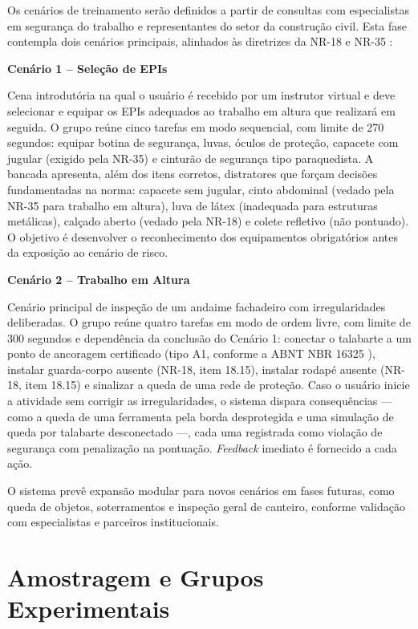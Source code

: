 Os cenários de treinamento serão definidos a partir de consultas com especialistas em segurança do trabalho e representantes do setor da construção civil. Esta fase contempla dois cenários principais, alinhados às diretrizes da NR-18 \cite{brasil2025nr18} e NR-35 \cite{brasil2023nr35}:

\textbf{Cenário 1 -- Seleção de EPIs}

Cena introdutória na qual o usuário é recebido por um instrutor virtual e deve selecionar e equipar os EPIs adequados ao trabalho em altura que realizará em seguida. O grupo reúne cinco tarefas em modo sequencial, com limite de 270 segundos: equipar botina de segurança, luvas, óculos de proteção, capacete com jugular (exigido pela NR-35) e cinturão de segurança tipo paraquedista. A bancada apresenta, além dos itens corretos, distratores que forçam decisões fundamentadas na norma: capacete sem jugular, cinto abdominal (vedado pela NR-35 para trabalho em altura), luva de látex (inadequada para estruturas metálicas), calçado aberto (vedado pela NR-18) e colete refletivo (não pontuado). O objetivo é desenvolver o reconhecimento dos equipamentos obrigatórios antes da exposição ao cenário de risco.

\textbf{Cenário 2 -- Trabalho em Altura}

Cenário principal de inspeção de um andaime fachadeiro com irregularidades deliberadas. O grupo reúne quatro tarefas em modo de ordem livre, com limite de 300 segundos e dependência da conclusão do Cenário 1: conectar o talabarte a um ponto de ancoragem certificado (tipo A1, conforme a ABNT NBR 16325 \cite{nbr16325}), instalar guarda-corpo ausente (NR-18, item 18.15), instalar rodapé ausente (NR-18, item 18.15) e sinalizar a queda de uma rede de proteção. Caso o usuário inicie a atividade sem corrigir as irregularidades, o sistema dispara consequências --- como a queda de uma ferramenta pela borda desprotegida e uma simulação de queda por talabarte desconectado ---, cada uma registrada como violação de segurança com penalização na pontuação. \textit{Feedback} imediato é fornecido a cada ação.

O sistema prevê expansão modular para novos cenários em fases futuras, como queda de objetos, soterramentos e inspeção geral de canteiro, conforme validação com especialistas e parceiros institucionais.

\section{Amostragem e Grupos Experimentais}

